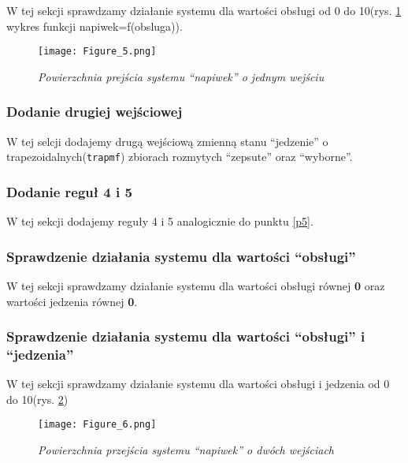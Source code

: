 W tej sekcji sprawdzamy działanie systemu dla wartości obsługi od 0 do 10(rys. \ref{fig:napiwek_obsluga} wykres funkcji napiwek=f(obsluga)).



\begin{figure}[H]
	\centering
	\texttt{[image: Figure\_5.png]}
	\caption{\textit{Powierzchnia prejścia systemu ``napiwek'' o jednym wejściu}}
	\label{fig:napiwek_obsluga}
\end{figure}

\subsubsection{Dodanie drugiej wejściowej}\label{ssc:dodanie_wejsciowej}
 
W tej selcji dodajemy drugą wejściową zmienną stanu ``jedzenie'' o trapezoidalnych(\verb|trapmf|) zbiorach rozmytych ``zepsute'' oraz ``wyborne''.



\subsubsection{Dodanie reguł 4 i 5}\label{ssc:dodanie_regul45}

W tej sekcji dodajemy reguły 4 i 5 analogicznie do punktu \ref{p5}.
\subsubsection{Sprawdzenie działania systemu dla wartości ``obsługi''}\label{ssc:sprawdzenie_dzialania_wartosc_obsluga}

W tej sekcji sprawdzamy działanie systemu dla wartości obsługi równej \textbf{0} oraz wartości jedzenia równej \textbf{0}.

\subsubsection{Sprawdzenie działania systemu dla wartości ``obsługi'' i ``jedzenia''}\label{ssc:sprawdzenie_dzialania_obsluga_jedzenie}

W tej sekcji sprawdzamy działanie systemu dla wartości obsługi i jedzenia od 0 do 10(rys. \ref{fig:napiwek_obsluga_jedzenie})

\begin{figure}[H]
	\centering
	\texttt{[image: Figure\_6.png]}
	\caption{\textit{Powierzchnia przejścia systemu ``napiwek'' o dwóch wejściach}}
	\label{fig:napiwek_obsluga_jedzenie}
\end{figure}
